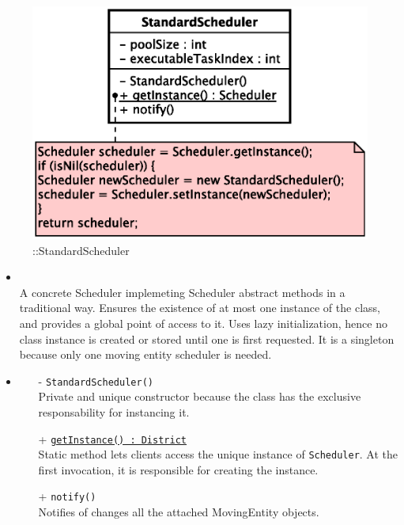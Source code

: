 \begin{figure}[h]
\centering
\includegraphics[scale=0.6,keepaspectratio]{images/solution/app/backend/standard_scheduler.eps}
\caption{\pScheduling::StandardScheduler}
\label{fig:sd-app-scheduling-standard-scheduler}
\end{figure}
\FloatBarrier
\begin{itemize}
  \item \textbf{\descr} \\
    A concrete Scheduler implemeting Scheduler abstract methods in a traditional way.
    Ensures the existence of at most one instance of the class, 
 	and provides a global point of access to it.
  	Uses lazy initialization, hence no class instance is created 
  	or stored until one is first requested.
    It is a singleton because only one moving entity scheduler is needed.
  \item \textbf{\ops}
  \begin{itemize}
    \item[-] \texttt{StandardScheduler()} \\
    Private and unique constructor because the class has the exclusive 
    responsability for instancing it.
    \item[+] \texttt{\underline{getInstance() : District}} \\
    Static method lets clients access the unique instance 
    of \texttt{Scheduler}. At the first invocation, it is responsible 
    for creating the instance.
    \item[+] \texttt{notify()} \\
	Notifies of changes all the attached MovingEntity objects.
  \end{itemize}
\end{itemize}
